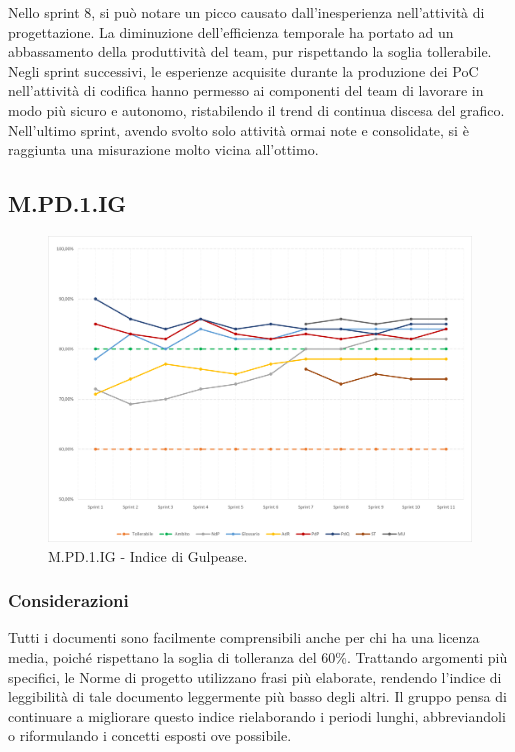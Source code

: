 \documentclass[10pt, a4paper]{article}
\begin{document}
Nello sprint 8, si può notare un picco causato dall'inesperienza nell'attività di progettazione. La diminuzione dell'efficienza temporale ha portato ad un abbassamento della produttività del team, pur rispettando la soglia tollerabile. Negli sprint successivi, le esperienze acquisite durante la produzione dei PoC nell'attività di codifica hanno permesso ai componenti del team di lavorare in modo più sicuro e autonomo, ristabilendo il trend di continua discesa del grafico. Nell'ultimo sprint, avendo svolto solo attività ormai note e consolidate, si è raggiunta una misurazione molto vicina all'ottimo.

\subsection{M.PD.1.IG}
\begin{figure}[H]
\includegraphics[width=15.5cm]{img/metriche/MPD1IG.png}
\caption{M.PD.1.IG - Indice di Gulpease.}
\end{figure}
\subsubsection{Considerazioni}
Tutti i documenti sono facilmente comprensibili anche per chi ha una licenza media, poiché rispettano la soglia di tolleranza del 60\%.
Trattando argomenti più specifici, le Norme di progetto utilizzano frasi più elaborate, rendendo l'indice di leggibilità di tale documento leggermente più basso degli altri.
Il gruppo pensa di continuare a migliorare questo indice rielaborando i periodi lunghi, abbreviandoli o riformulando i concetti esposti ove possibile.
\end{document}

